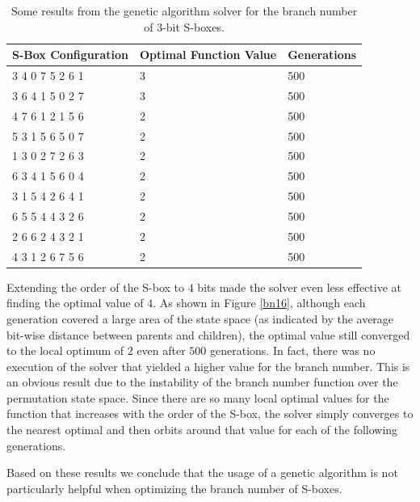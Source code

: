 \documentclass[11pt]{article}
\begin{document}
\begin{table}
	\centering
	\label{bnTable}
	\caption{Some results from the genetic algorithm solver for the branch number of $3$-bit S-boxes.}
    \begin{tabular}{|l|l|l|}
        \hline
        S-Box Configuration & Optimal Function Value & Generations \\ \hline
        3     4     0     7     5     2     6     1 & 3 & 500 \\ 
	3     6     4     1     5     0     2     7 & 3 & 500 \\ 
        4     7     6     1     2     1     5     6 & 2 & 500 \\ 
        5     3     1     5     6     5     0     7 & 2 & 500 \\ 
        1     3     0     2     7     2     6     3 & 2 & 500 \\ 
        6     3     4     1     5     6     0     4 & 2 & 500 \\ 
        3     1     5     4     2     6     4     1 & 2 & 500 \\ 
        6     5     5     4     4     3     2     6 & 2 & 500 \\ 
        2     6     6     2     4     3     2     1 & 2 & 500 \\ 
        4     3     1     2     6     7     5     6 & 2 & 500 \\
        \hline
    \end{tabular}
\end{table}

Extending the order of the S-box to $4$ bits made the solver even less effective at finding the optimal value of $4$. As shown in Figure \ref{bn16}, although each generation covered a large area of the state space (as indicated by the average bit-wise distance between parents and children), the optimal value still converged to the local optimum of $2$ even after $500$ generations. In fact, there was no execution of the solver that yielded a higher value for the branch number. This is an obvious result due to the instability of the branch number function over the permutation state space. Since there are so many local optimal values for the function that increases with the order of the S-box, the solver simply converges to the nearest optimal and then orbits around that value for each of the following generations. 

Based on these results we conclude that the usage of a genetic algorithm is not particularly helpful when optimizing the branch number of S-boxes.
\end{document}

